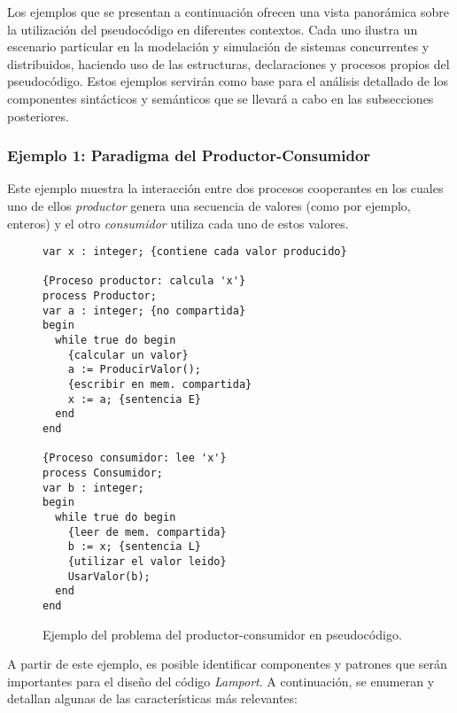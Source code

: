 Los ejemplos que se presentan a continuación ofrecen una vista panorámica sobre la utilización del pseudocódigo en diferentes contextos. Cada uno ilustra un escenario particular en la modelación y simulación de sistemas concurrentes y distribuidos, haciendo uso de las estructuras, declaraciones y procesos propios del pseudocódigo. Estos ejemplos servirán como base para el análisis detallado de los componentes sintácticos y semánticos que se llevará a cabo en las subsecciones posteriores.

\subsubsection{Ejemplo 1: Paradigma del Productor-Consumidor}\label{subsubsec:pseudoAnalisisEjemplo1}
Este ejemplo muestra la interacción entre dos procesos cooperantes en los cuales uno de ellos \textit{productor} genera una secuencia de valores (como por ejemplo, enteros) y el otro \textit{consumidor} utiliza cada uno de estos valores.

\begin{figure}[h]
\begin{lstlisting}[style=lamportStyle]
var x : integer; {contiene cada valor producido}

{Proceso productor: calcula 'x'}
process Productor;
var a : integer; {no compartida}
begin
  while true do begin
    {calcular un valor}
    a := ProducirValor();
    {escribir en mem. compartida}
    x := a; {sentencia E}
  end
end

{Proceso consumidor: lee 'x'}
process Consumidor;
var b : integer;
begin
  while true do begin
    {leer de mem. compartida}
    b := x; {sentencia L}
    {utilizar el valor leido}
    UsarValor(b);
  end
end
\end{lstlisting}
\caption{Ejemplo del problema del productor-consumidor en pseudocódigo.}
\label{fig:ejemplo1}
\end{figure}

\newpage


A partir de este ejemplo, es posible identificar componentes y patrones que serán importantes para el diseño del código \textit{Lamport}. A continuación, se enumeran y detallan algunas de las características más relevantes:

